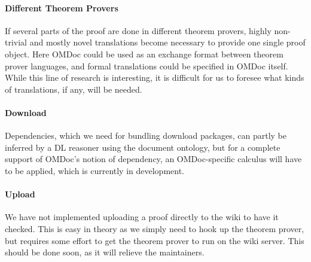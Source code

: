 \begin{discussion}
\paragraph{Different Theorem Provers} If several parts of the proof are done in different
theorem provers, highly non-trivial and mostly novel translations become
necessary to provide one single proof object. Here OMDoc could be used as an
exchange format between theorem prover languages, and formal translations could
be specified in OMDoc itself.  While this line of research is interesting, it is
difficult for us to foresee what kinds of translations, if any, will be needed.

\paragraph{Download}
Dependencies, which we need for bundling download packages, can partly be
inferred by a DL reasoner using the document ontology, but for a complete
support of OMDoc's notion of dependency, an OMDoc-specific calculus will have to
be applied, which is currently in development.

\paragraph{Upload} We have not implemented uploading a proof
directly to the wiki to have it checked.  This is easy in theory
as we simply need to hook up the theorem prover, but requires some
effort to get the theorem prover to run on the wiki server.  This
should be done soon, as it will relieve the maintainers.
\end{discussion}


